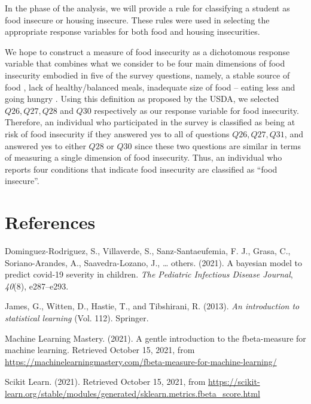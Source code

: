 \documentclass[
  10pt,
]{article}
\begin{document}
In the phase of the analysis, we will provide a rule for classifying a student as food insecure or housing insecure. These rules were used in selecting the appropriate response variables for both food and housing insecurities.

We hope to construct a measure of food insecurity as a dichotomous response variable that combines what we consider to be four main dimensions of food insecurity embodied in five of the survey questions, namely, a stable source of food , lack of healthy/balanced meals, inadequate size of food -- eating less and going hungry . Using this definition as proposed by the USDA, we selected \(Q26, Q27, Q28\) and \(Q30\) respectively as our response variable for food insecurity. Therefore, an individual who participated in the survey is classified as being at risk of food insecurity if they answered yes to all of questions \(Q26, Q27, Q31\), and answered yes to either \(Q28\) or \(Q30\) since these two questions are similar in terms of measuring a single dimension of food insecurity. Thus, an individual who reports four conditions that indicate food insecurity are classified as ``food insecure''.

\hypertarget{references}{%
\section*{References}\label{references}}

\hypertarget{refs}{}
\leavevmode\hypertarget{ref-dominguez2021bayesian}{}%
Dominguez-Rodriguez, S., Villaverde, S., Sanz-Santaeufemia, F. J., Grasa, C., Soriano-Arandes, A., Saavedra-Lozano, J., \ldots{} others. (2021). A bayesian model to predict covid-19 severity in children. \emph{The Pediatric Infectious Disease Journal}, \emph{40}(8), e287--e293.

\leavevmode\hypertarget{ref-james2013introduction}{}%
James, G., Witten, D., Hastie, T., and Tibshirani, R. (2013). \emph{An introduction to statistical learning} (Vol. 112). Springer.

\leavevmode\hypertarget{ref-MLM}{}%
Machine Learning Mastery. (2021). A gentle introduction to the fbeta-measure for machine learning. Retrieved October 15, 2021, from \url{https://machinelearningmastery.com/fbeta-measure-for-machine-learning/}

\leavevmode\hypertarget{ref-scikit_learn}{}%
Scikit Learn. (2021). Retrieved October 15, 2021, from \url{https://scikit-learn.org/stable/modules/generated/sklearn.metrics.fbeta_score.html}
\end{document}
